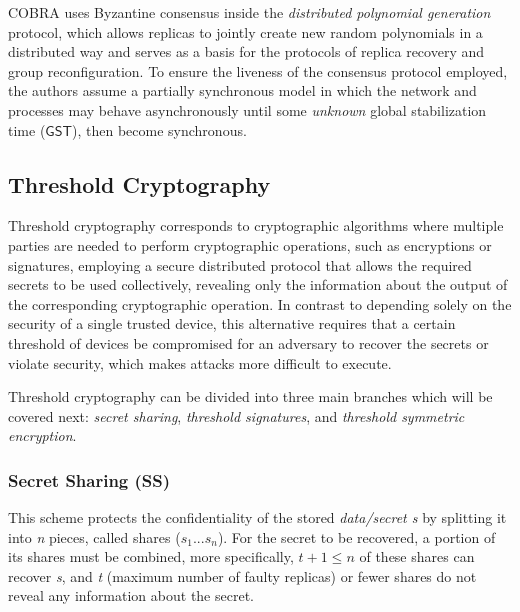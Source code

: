 \documentclass[runningheads]{llncs}
\begin{document}
COBRA uses Byzantine consensus inside the \textit{distributed polynomial generation} protocol, which allows replicas to jointly create new random polynomials in a distributed way and serves as a basis for the protocols of replica recovery and group reconfiguration. To ensure the liveness of the consensus protocol employed, the authors assume a partially synchronous model \cite{partiallysynchronous} in which the network and processes may behave asynchronously until some \textit{unknown} global stabilization time ($\mathsf{GST}$), then become synchronous. 

\subsection{Threshold Cryptography} \label{subsec:thresholdcrypt}
Threshold cryptography corresponds to cryptographic algorithms where multiple parties are needed to perform cryptographic operations, such as encryptions or signatures, employing a secure distributed protocol that allows the required secrets to be used collectively, revealing only the information about the output of the corresponding cryptographic operation. In contrast to depending solely on the security of a single trusted device, this alternative requires that a certain threshold of devices be compromised for an adversary to recover the secrets or violate security, which makes attacks more difficult to execute.

Threshold cryptography can be divided into three main branches which will be covered next:\textit{ secret sharing}, \textit{threshold signatures}, and \textit{threshold symmetric encryption}.

\subsubsection{Secret Sharing (SS)} \label{subsec:secretsharing}
This scheme protects the confidentiality of the stored \textit{data/secret s} by splitting it into \textit{n} pieces, called shares ($s_1...s_n$). For the secret to be recovered, a portion of its shares must be combined, more specifically, $t + 1 \le n$ of these shares can recover \textit{s}, and \textit{t} (maximum number of faulty replicas) or fewer shares do not reveal any information about the secret.
\end{document}
